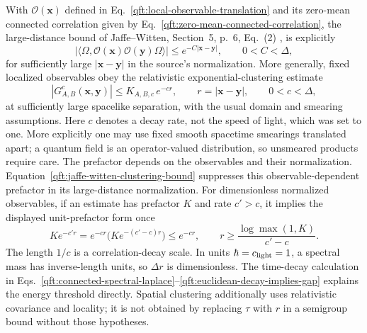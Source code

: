 With $\mathcal O(\mathbf x)$ defined in
Eq.~\eqref{qft:local-observable-translation} and its zero-mean connected
correlation given by Eq.~\eqref{qft:zero-mean-connected-correlation}, the
large-distance bound of Jaffe--Witten, Section~5, p.~6, Eq.~(2)
\cite{JaffeWitten2006}, is explicitly
\begin{equation}\label{qft:jaffe-witten-clustering-bound}
 \left|\langle\Omega,
       \mathcal O(\mathbf x)\mathcal O(\mathbf y)\Omega\rangle\right|
 \le e^{-C|\mathbf x-\mathbf y|},\qquad
 0<C<\Delta,
\end{equation}
for sufficiently large $|\mathbf x-\mathbf y|$ in the source's
normalization. More generally, fixed localized observables obey the
relativistic exponential-clustering estimate
\begin{equation}\label{qft:spatial-exponential-clustering}
 |G^c_{A,B}(\mathbf x,\mathbf y)|
 \le K_{A,B,c}\,e^{-c r},\qquad
 r=|\mathbf x-\mathbf y|,\qquad 0<c<\Delta,
\end{equation}
at sufficiently large spacelike separation, with the usual domain and
smearing assumptions. Here $c$ denotes a decay rate, not the speed of
light, which was set to one. More explicitly one may use fixed smooth
spacetime smearings translated apart; a quantum field is an
operator-valued distribution, so unsmeared products require care.
The prefactor depends on the observables and their normalization.
Equation~\eqref{qft:jaffe-witten-clustering-bound} suppresses this
observable-dependent prefactor in its large-distance normalization.
For dimensionless normalized observables, if an estimate has prefactor
$K$ and rate $c'>c$, it implies the displayed unit-prefactor form once
\begin{equation}\label{qft:absorb-clustering-prefactor}
 K e^{-c'r}=e^{-cr}\bigl(K e^{-(c'-c)r}\bigr)\le e^{-cr},
 \qquad
 r\ge\frac{\log\max(1,K)}{c'-c}.
\end{equation}
The length $1/c$ is a correlation-decay scale. In units $\hbar=c_{\rm light}=1$,
a spectral mass has inverse-length units, so $\Delta r$ is dimensionless.
The time-decay calculation in
Eqs.~\eqref{qft:connected-spectral-laplace}--\eqref{qft:euclidean-decay-implies-gap}
explains the energy threshold directly. Spatial clustering additionally
uses relativistic covariance and locality; it is not obtained by replacing
$\tau$ with $r$ in a semigroup bound without those hypotheses.

